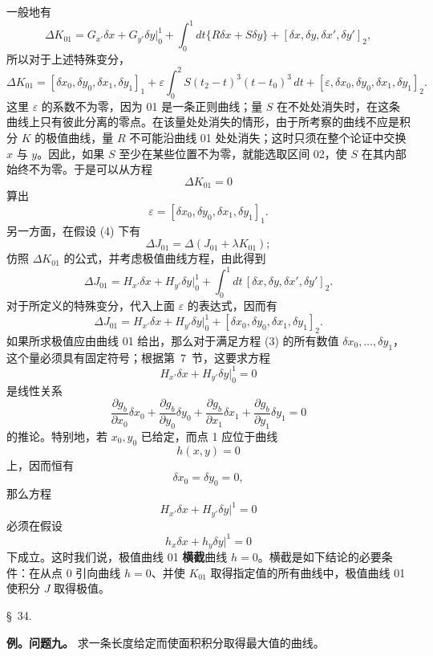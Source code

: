 \documentclass[11pt,a4paper,leqno]{article}
\begin{document}
一般地有
\[
\Delta K_{01}=G_{x'}\delta x+G_{y'}\delta y\bigg|_0^1+
\int_0^1dt\{R\delta x+S\delta y\}
+[\delta x,\delta y,\delta x',\delta y']_2,
\]
所以对于上述特殊变分，
\[
\Delta K_{01}=[\delta x_0,\delta y_0,\delta x_1,\delta y_1]_1+
\varepsilon\int_0^2S(t_2-t)^3(t-t_0)^3\,dt
+[\varepsilon,\delta x_0,\delta y_0,\delta x_1,\delta y_1]_2.
\]
这里 $\varepsilon$ 的系数不为零，因为 01 是一条正则曲线；量 $S$ 在不处处消失时，在这条曲线上只有彼此分离的零点。在该量处处消失的情形，由于所考察的曲线不应是积分 $K$ 的极值曲线，量 $R$ 不可能沿曲线 01 处处消失；这时只须在整个论证中交换 $x$ 与 $y$。因此，如果 $S$ 至少在某些位置不为零，就能选取区间 02，使 $S$ 在其内部始终不为零。于是可以从方程
\begin{equation}\tag{4}
\Delta K_{01}=0
\end{equation}
算出
\[
\varepsilon=[\delta x_0,\delta y_0,\delta x_1,\delta y_1]_1.
\]
另一方面，在假设 (4) 下有
\[
\Delta J_{01}=\Delta(J_{01}+\lambda K_{01});
\]
仿照 $\Delta K_{01}$ 的公式，并考虑极值曲线方程，由此得到
\[
\Delta J_{01}=H_{x'}\delta x+H_{y'}\delta y\bigg|_0^1+
\int_0^1dt\,[\delta x,\delta y,\delta x',\delta y']_2.
\]
对于所定义的特殊变分，代入上面 $\varepsilon$ 的表达式，因而有
\[
\Delta J_{01}=H_{x'}\delta x+H_{y'}\delta y\bigg|_0^1+
[\delta x_0,\delta y_0,\delta x_1,\delta y_1]_2.
\]
如果所求极值应由曲线 01 给出，那么对于满足方程 (3) 的所有数值 $\delta x_0,\ldots,\delta y_1$，这个量必须具有固定符号；根据第~7~节，这要求方程
\[
H_{x'}\delta x+H_{y'}\delta y\bigg|_0^1=0
\]
是线性关系
\[
\frac{\partial g_b}{\partial x_0}\delta x_0+
\frac{\partial g_b}{\partial y_0}\delta y_0+
\frac{\partial g_b}{\partial x_1}\delta x_1+
\frac{\partial g_b}{\partial y_1}\delta y_1=0
\]
的推论。特别地，若 $x_0,y_0$ 已给定，而点 1 应位于曲线
\[
h(x,y)=0
\]
上，因而恒有
\[
\delta x_0=\delta y_0=0,
\]
那么方程
\[
H_{x'}\delta x+H_{y'}\delta y\bigg|^1=0
\]
必须在假设
\[
h_x\delta x+h_y\delta y\bigg|^1=0
\]
下成立。这时我们说，极值曲线 01 \textbf{横截}曲线 $h=0$。横截是如下结论的必要条件：在从点 0 引向曲线 $h=0$、并使 $K_{01}$ 取得指定值的所有曲线中，极值曲线 01 使积分 $J$ 取得极值。

\begin{center}{\large \S~34.}\end{center}

\noindent\textbf{例。问题九。} 求一条长度给定而使面积积分取得最大值的曲线。
\end{document}

